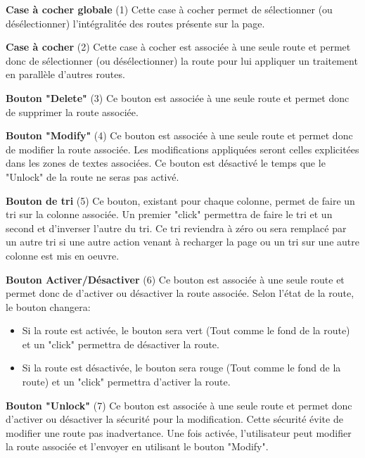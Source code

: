 \textbf{Case à cocher globale} (1)\newline
Cette case à cocher permet de sélectionner (ou désélectionner) l'intégralitée des routes présente sur la page.\newline

\textbf{Case à cocher} (2)\newline
Cette case à cocher est associée à une seule route et permet donc de sélectionner (ou désélectionner) la route pour lui appliquer un traitement en parallèle d'autres routes.\newline

\textbf{Bouton "Delete"} (3)\newline
Ce bouton est associée à une seule route et permet donc de supprimer la route associée.\newline

\textbf{Bouton "Modify"} (4)\newline
Ce bouton est associée à une seule route et permet donc de modifier la route associée. Les modifications appliquées seront celles explicitées dans les zones de textes associées. Ce bouton est désactivé le temps que le "Unlock" de la route ne seras pas activé. \newline

\textbf{Bouton de tri} (5)\newline
Ce bouton, existant pour chaque colonne, permet de faire un tri sur la colonne associée. Un premier "click" permettra de faire le tri et un second et d'inverser l'autre du tri. Ce tri reviendra à zéro ou sera remplacé par un autre tri si une autre action venant à recharger la page ou un tri sur une autre colonne est mis en oeuvre.\newline

\textbf{Bouton Activer/Désactiver} (6)\newline
Ce bouton est associée à une seule route et permet donc de d'activer ou désactiver la route associée. Selon l'état de la route, le bouton changera:
\begin{itemize}
    \item Si la route est activée, le bouton sera vert (Tout comme le fond de la route) et un "click" permettra de désactiver la route.
    \item Si la route est désactivée, le bouton sera rouge (Tout comme le fond de la route) et un "click" permettra d'activer la route.\newline
\end{itemize}

\textbf{Bouton "Unlock"} (7)\newline
Ce bouton est associée à une seule route et permet donc d'activer ou désactiver la sécurité pour la modification. Cette sécurité évite de modifier une route pas inadvertance. Une fois activée, l'utilisateur peut modifier la route associée et l'envoyer en utilisant le bouton "Modify".\newline

